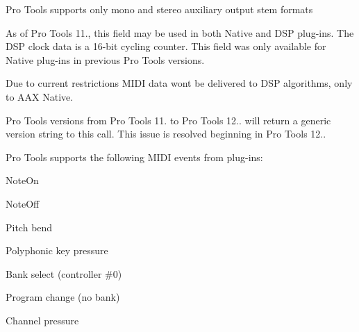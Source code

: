 \begin{DoxyRefList}
\label{a00879__compatibility_notes000053}%
%
 Pro Tools supports only mono and stereo auxiliary output stem formats 
\item[Member \mbox{\hyperlink{a02216_a59727dee1043fcd7f14da130ab254445}{AAX\+\_\+\+IComponent\+Descriptor\+::Add\+Clock}} (AAX\+\_\+\+CField\+Index in\+Field\+Index)=0]\label{a00879__compatibility_notes000051}%
%
 As of Pro Tools 11., this field may be used in both Native and DSP plug-\/ins. The DSP clock data is a 16-\/bit cycling counter. This field was only available for Native plug-\/ins in previous Pro Tools versions. 
\item[Member \mbox{\hyperlink{a02216_a6284dda9ccca898e33075de29dad4e39}{AAX\+\_\+\+IComponent\+Descriptor\+::Add\+MIDINode}} (AAX\+\_\+\+CField\+Index in\+Field\+Index, AAX\+\_\+\+EMIDINode\+Type in\+Node\+Type, const char in\+Node\+Name\mbox{[}\mbox{]}, uint32\+\_\+t channel\+Mask)=0]\label{a00879__compatibility_notes000054}%
%
 Due to current restrictions MIDI data won\textquotesingle{}t be delivered to DSP algorithms, only to AAX Native. 
\item[Member \mbox{\hyperlink{a02224_ad2a002a133491b2ed572054588641e78}{AAX\+\_\+\+IController\+::Get\+Host\+Name}} (\mbox{\hyperlink{a02332}{AAX\+\_\+\+IString}} $\ast$out\+Host\+Name\+String) const =0]\label{a00879__compatibility_notes000055}%
%
 Pro Tools versions from Pro Tools 11. to Pro Tools 12.. will return a generic version string to this call. This issue is resolved beginning in Pro Tools 12.. 
\item[Member \mbox{\hyperlink{a02292_a5e1c5409158164f57376f908c9693a8b}{AAX\+\_\+\+IMIDINode\+::Post\+MIDIPacket}} (\mbox{\hyperlink{a01792}{AAX\+\_\+\+CMidi\+Packet}} $\ast$packet)=0]\label{a00879__compatibility_notes000056}%
%
 Pro Tools supports the following MIDI events from plug-\/ins\+:
\begin{DoxyItemize}
\item Note\+On
\item Note\+Off
\item Pitch bend
\item Polyphonic key pressure
\item Bank select (controller \#0)
\item Program change (no bank)
\item Channel pressure 

\end{DoxyItemize}
\end{DoxyRefList}
